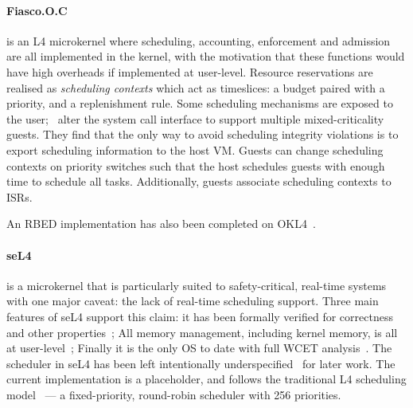 \paragraph{Fiasco.O.C} is an L4 microkernel where scheduling, accounting, enforcement and admission
are all implemented in the kernel, with the motivation that these functions would have high
overheads if implemented at user-level.  Resource reservations are realised as \emph{scheduling
contexts} which act as timeslices: a budget paired with a priority, and a replenishment rule.  Some
scheduling mechanisms are exposed to the user;~\citet{Lackorzynski_WVH_12} alter the system call
interface to support multiple mixed-criticality guests.  They find that the only way to avoid
scheduling integrity violations is to export scheduling information to the host \gls{VM}.  Guests
can change scheduling contexts on priority switches such that the host schedules guests with enough
time to schedule all tasks.  Additionally, guests associate scheduling contexts to \glspl{ISR}.

An \gls{RBED} implementation has also been completed on OKL4~\citep{Petters_LHE_09}.

\paragraph{seL4} is a microkernel that is particularly suited to safety-critical, real-time systems
with one major caveat: the lack of real-time scheduling support.  Three main features of seL4
support this claim: it has been formally verified for correctness~\citep{Klein_EHACDEEKNSTW_09} and
other properties~\citep{Sewell_WGMAK_11}; All memory management, including kernel memory, is all at
user-level~\citep{Elkaduwe_Derrin_06}; Finally it is the only \gls{OS} to date with full \gls{WCET}
analysis~\citep{Blackham_SCRH_11}.  The scheduler in seL4 has been left intentionally
underspecified~\citep{Petters_EH_12} for later work.  The current implementation is a placeholder,
and follows the traditional L4 scheduling model~\citep{Ruocco_06} --- a fixed-priority, round-robin
scheduler with 256 priorities.

